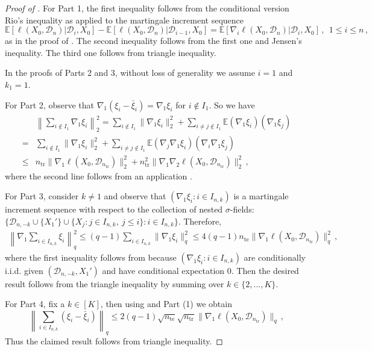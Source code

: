 \documentclass[11pt]{article}
\theoremstyle{plain}
\newcommand{\tr}{{\mathrm{tr}}}
\newcommand{\te}{{\mathrm{te}}}
\newcommand{\D}{{\mathcal{D}}}
\begin{document}
\begin{proof}
    [Proof of ]
For Part 1, the first inequality follows from the conditional version Rio's inequality as applied to the martingale increment sequence 
$$\mathbb E[\ell(X_0,\D_n)|\D_i,X_0]-\mathbb E[\ell(X_0,\D_n)|\D_{i-1},X_0]=\mathbb E[\nabla_i \ell(X_0,\D_n)|\D_i,X_0]\,,~~1\le i\le n\,,$$ as in the proof of . The second inequality follows from the first one and Jensen's inequality. The third one follows from triangle inequality.

In the proofs of Parts 2 and 3, without loss of generality we assume $i=1$ and $k_1=1$.

For Part 2, observe that $\nabla_1(\xi_i-\bar\xi_i)=\nabla_1\xi_i$ for $i\notin I_1$. So we have
\begin{align*}
    &\left\|\sum_{i\notin I_1}\nabla_1\xi_i\right\|_2^2
    =\sum_{i\notin I_1} \|\nabla_1\xi_i\|_2^2 + \sum_{i\neq j\notin I_1}\mathbb E(\nabla_1 \xi_i)(\nabla_1\xi_j)\\
    =&\sum_{i\notin I_1} \|\nabla_1\xi_i\|_2^2 + \sum_{i\neq j\notin I_1}\mathbb E(\nabla_j\nabla_1 \xi_i)(\nabla_i\nabla_1\xi_j)\\
    \le & n_\tr \|\nabla_1\ell(X_0,\D_{n_\tr})\|_2^2 + n_\tr^2 \|\nabla_1\nabla_2\ell(X_0,\D_{n_\tr})\|_2^2\,,
 \end{align*}
 where the second line follows from an application .

For Part 3, consider $k\neq 1$ and observe that $(\nabla_1\xi_i:i\in I_{n,k})$ is a martingale increment sequence with respect to the collection of nested $\sigma$-fields: $\{\D_{n,-k}\cup\{X_1'\}\cup \{X_j:j\in I_{n,k},~j\le i\}:i \in I_{n,k}\}$. Therefore,
 \begin{align*}
 \left\|\nabla_1\sum_{i\in I_{n,k}}\xi_i\right\|_q^2 \le (q-1) \sum_{i\in I_{n,k}} \|\nabla_1 \xi_i\|_q^2 \le  4(q-1) n_\te \|\nabla_1 \ell(X_0,\D_{n_\tr})\|_q^2\,,
 \end{align*}
 where the first inequality follows from  because $(\nabla_1\xi_i:i\in I_{n,k})$ are conditionally i.i.d. given $(\D_{n,-k},X_1')$ and have conditional expectation $0$. 
 Then the desired result follows from the triangle inequality by summing over $k\in\{2,...,K\}$.

For Part 4, fix a $k\in[K]$,
then using  and Part (1) we obtain
$$
\left\|\sum_{i\in I_{n,k}}(\xi_i-\bar\xi_i)\right\|_q\le 2(q-1)\sqrt{n_\te}\sqrt{n_\tr}\|\nabla_1\ell(X_0,\D_{n_\tr})\|_q\,,
$$
Thus the claimed result follows from triangle inequality.
\end{proof}
\end{document}
